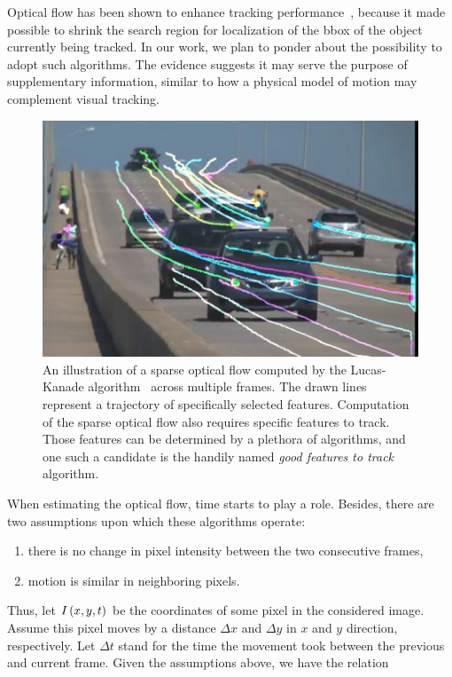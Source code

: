 Optical flow has been shown to enhance tracking performance~\cite{Leal-Taixe2016}, because it made possible to shrink the search region for localization of the \gls{bbox} of the object currently being tracked. In our work, we plan to ponder about the possibility to adopt such algorithms. The evidence suggests it may serve the purpose of supplementary information, similar to how a physical model of motion may complement visual tracking.

\begin{figure}[t]
    \centerline{\includegraphics[width=0.5\linewidth]{figures/theoretical_foundations/opticalflow_lk.jpg}}
    \caption[Sparse optical flow]{An illustration of a sparse optical flow computed by the Lucas-Kanade algorithm~\cite{Lucas1981} across multiple frames. The drawn lines represent a trajectory of specifically selected features. Computation of the sparse optical flow also requires specific features to track. Those features can be determined by a plethora of algorithms, and one such a candidate is the handily named \emph{good features to track}~\cite{Shi1994} algorithm. }
    \label{fig:OpticalFlowLucasKanade}
\end{figure}

When estimating the optical flow, time starts to play a role. Besides, there are two assumptions upon which these algorithms operate:

\begin{enumerate}
    \item there is no change in pixel intensity between the two consecutive frames,
    \item motion is similar in neighboring pixels.
\end{enumerate}

\noindent Thus, let ${I} \left( x, y, t \right)$ be the coordinates of some pixel in the considered image. Assume this pixel moves by a distance $\Delta x$ and $\Delta y$ in $x$ and $y$ direction, respectively. Let $\Delta t$ stand for the time the movement took between the previous and current frame. Given the assumptions above, we have the relation

